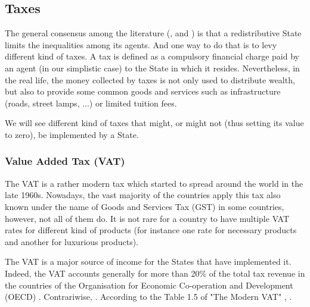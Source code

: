 \subsection{Taxes}

    The general consensus among the literature (\cite{burman2012taxes}, \cite{leigh2008redistributive} and \cite{taxes_inequalities}) is that a redistributive State limits the inequalities among its agents. And one way to do that is to levy different kind of taxes. A tax is defined as a compulsory financial charge paid by an agent (in our simplistic case) to the State in which it resides. 
    Nevertheless, in the real life, the money collected by taxes is not only used to distribute wealth, but also to provide some common goods and services such as infrastructure (roads, street lamps, ...) or limited tuition fees.
    
    We will see different kind of taxes that might, or might not (thus setting its value to zero), be implemented by a State.

    \subsubsection{Value Added Tax (VAT)}
    
    The VAT is a rather modern tax which started to spread around the world in the late 1960s. Nowadays, the vast majority of the countries apply this tax also known under the name of Goods and Services Tax (GST) in some countries, however, not all of them do. It is not rare for a country to have multiple VAT rates for different kind of products (for instance one rate for necessary products and another for luxurious products).
    
    The VAT is a major source of income for the States that have implemented it. Indeed, the VAT accounts generally for more than 20\% of the total tax revenue in the countries of the Organisation for Economic Co-operation and Development (OECD) \cite{TheModernVAT}. Contrariwise,  \cite{OriginOfVAT}. According to the Table 1.5 of "The Modern VAT" \cite{TheModernVAT}, . 
    
